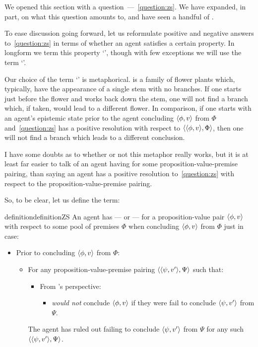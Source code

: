 \begin{note}
  We opened this section with a question~---~\autoref{question:zs}.
  We have expanded, in part, on what this question amounts to, and have seen a handful of .

  To ease discussion going forward, let us reformulate positive and negative answers to~\autoref{question:zs} in terms of whether an agent satisfies a certain property.
  In longform we term this property `', though with few exceptions we will use the term `'.

  Our choice of the term `' is metaphorical.
   is a family of flower plants which, typically, have the appearance of a single stem with no branches.
  If one starts just before the flower and works back down the stem, one will not find a branch which, if taken, would lead to a different flower.
  In comparison, if one starts with an agent's epistemic state prior to the agent concluding \(\langle \phi, v \rangle\) from \(\Phi\) and~\autoref{question:zs} has a positive resolution with respect to \(\langle \langle \phi, v \rangle, \Phi \rangle\), then one will not find a branch which leads to a different conclusion.

  I have some doubts as to whether or not this metaphor really works, but it is at least far easier to talk of an agent having \zs{} for some proposition-value-premise pairing, than saying an agent has a positive resolution to~\autoref{question:zs} with respect to the proposition-value-premise pairing.

  So, to be clear, let us define the term:

  \begin{restatable}[\zsN{2} --- \zs{}]{definition}{definitionZS}
    \label{def:zs}
    An agent \vAgent{} has \zs{} --- or  --- for a proposition-value pair \(\langle \phi, v \rangle\) with respect to some pool of premises \(\Phi\) when concluding \(\langle \phi, v \rangle\) from \(\Phi\) just in case:
    \begin{itemize}
    \item
      Prior to concluding \(\langle \phi, v \rangle\) from \(\Phi\):
      \begin{itemize}
      \item
        For any proposition-value-premise pairing \(\langle \langle \psi, v' \rangle, \Psi \rangle\) such that:
        \begin{itemize}
        \item
          From \vAgent{}'s perspective:
          \begin{itemize}
          \item
            \vAgent{} \emph{would not} conclude \(\langle \phi, v \rangle\) if they were fail to conclude \(\langle \psi, v' \rangle\) from \(\Psi\).
          \end{itemize}
        \end{itemize}
        The agent has ruled out failing to conclude \(\langle \psi, v' \rangle\) from \(\Psi\) for any such \(\langle \langle \psi, v' \rangle, \Psi \rangle\).
      \end{itemize}
    \end{itemize}
    \vspace{-\baselineskip}
  \end{restatable}


\end{note}

